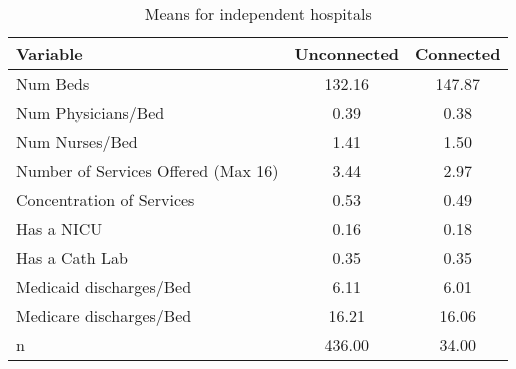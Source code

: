 \begin{table}[ht!]
\centering
\caption{Means for independent hospitals}
\centering
\begin{tabular}[t]{lcc}
\toprule
Variable & Unconnected & Connected\\
\midrule
Num Beds & 132.16 & 147.87\\
Num Physicians/Bed & 0.39 & 0.38\\
Num Nurses/Bed & 1.41 & 1.50\\
Number of Services Offered (Max 16) & 3.44 & 2.97\\
Concentration of Services & 0.53 & 0.49\\
\addlinespace
Has a NICU & 0.16 & 0.18\\
Has a Cath Lab & 0.35 & 0.35\\
Medicaid discharges/Bed & 6.11 & 6.01\\
Medicare discharges/Bed & 16.21 & 16.06\\
n & 436.00 & 34.00\\
\bottomrule
\end{tabular}
\end{table}
